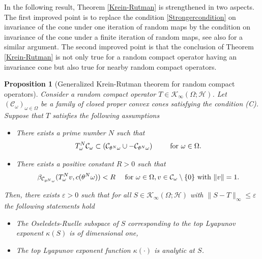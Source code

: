 \documentclass[pdflatex,sn-mathphys-num]{sn-jnl}%
\theoremstyle{thmstyleone}%
\newtheorem{proposition}[theorem]{Proposition}%
\theoremstyle{thmstyletwo}%
\theoremstyle{thmstylethree}%
\newcommand{\eps}{\varepsilon}
\numberwithin{equation}{section}
\begin{document}
%
%
In the following result, Theorem \ref{Krein-Rutman} is strengthened in two aspects. The first improved point is to replace the condition \eqref{Strongercondition} on invariance of the cone under one iteration of random maps by the condition on invariance of the cone under a finite iteration of random maps, see also \cite[Theorem 4]{Doan17} for a similar argument. The second improved point is that the conclusion of Theorem \ref{Krein-Rutman} is not only true for a random compact operator having an invariance cone but also true for nearby random compact operators. 


%
%
\begin{proposition}[Generalized Krein-Rutman theorem for random compact operators]\label{GeneralizedKrein-Rutman}
 Consider a random compact operator $T\in \mathcal K_{\infty}(\Omega;\mathcal H)$. Let $(\mathcal C_{\omega})_{\omega\in\Omega}$ be a family of closed proper convex cones satisfying the condition (C). Suppose that $T$ satisfies the following assumptions 
 \begin{itemize}
     \item [(A1)] There exists a prime number $N$ such that 
     \[
     T^N_{\omega}\mathcal C_{\omega}\subset \left(\mathcal C_{\theta^N \omega} \cup - \mathcal C_{\theta^N \omega}\right)\qquad\hbox{ for } \omega\in\Omega.
     \]
     \item [(A2)] There exists a positive constant $R>0$ such that \begin{equation}\label{InvarianceCone_Condition}
\beta_{\mathcal C_{\theta^N\omega}}(T^N_{\omega}v, c(\theta^N\omega))< R\quad \hbox{ for } \omega\in\Omega, v\in \mathcal C_{\omega}\setminus\{0\} \hbox{ with } \|v\|=1.
\end{equation}
 \end{itemize}
 Then, there exists $\eps>0$ such that for all $S\in \mathcal K_{\infty}(\Omega;\mathcal H)$ with $\|S-T\|_{\infty}\leq \eps$ the following statements hold
\begin{itemize}
\item [(i)] The Oseledets-Ruelle subspace of $S$ corresponding to the top Lyapunov exponent $\kappa(S)$ is of dimensional one,
\item [(ii)] The top Lyapunov exponent function $\kappa(\cdot)$ is analytic at $S$.
\end{itemize}
\end{proposition}
%
\end{document}
